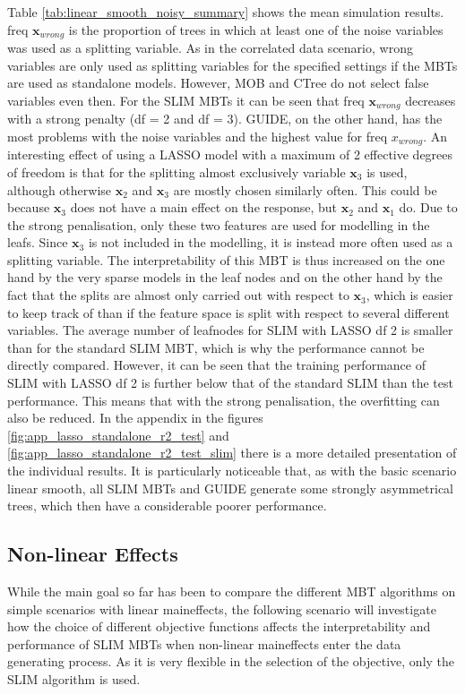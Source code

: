 Table \ref{tab:linear_smooth_noisy_summary} shows the mean simulation results. freq $ \textbf{x}_{wrong}$ is the proportion of trees in which at least one of the noise variables was used as a splitting variable. 
As in the correlated data scenario, wrong variables are only used as splitting variables for the specified settings if the MBTs are used as standalone models. However, MOB and CTree do not select false variables even then. For the SLIM MBTs it can be seen that freq $\textbf{x}_{wrong}$ decreases with a strong penalty (df = 2 and df = 3). GUIDE, on the other hand, has the most problems with the noise variables and the highest value for freq $x_{wrong}$.
An interesting effect of using a LASSO model with a maximum of 2 effective degrees of freedom is that for the splitting almost exclusively variable $\textbf{x}_3$ is used, although otherwise $\textbf{x}_2$ and $\textbf{x}_3$ are mostly chosen similarly often. This could be because $\textbf{x}_3$ does not have a main effect on the response, but $\textbf{x}_2$ and $\textbf{x}_1$ do.  Due to the strong penalisation, only these two features are used for modelling in the leafs. Since $\textbf{x}_3$ is not included in the modelling, it is instead more often used as a splitting variable.
The interpretability of this MBT is thus increased on the one hand by the very sparse models in the leaf nodes and on the other hand by the fact that the splits are almost only carried out with respect to $\textbf{x}_3$, which is easier to keep track of than if the feature space is split with respect to several different variables.
The average number of leafnodes for SLIM with LASSO df 2 is smaller than for the standard SLIM MBT, which is why the performance cannot be directly compared.  However, it can be seen that the training performance of SLIM with LASSO df 2 is further below that of the standard SLIM than the test performance. This means that with the strong penalisation, the overfitting can also be reduced.
In the appendix in the figures \ref{fig:app_lasso_standalone_r2_test} and \ref{fig:app_lasso_standalone_r2_test_slim} there is a more detailed presentation of the individual results. It is particularly noticeable that, as with the basic scenario linear smooth, all SLIM MBTs and GUIDE generate some strongly asymmetrical trees, which then have a considerable poorer performance.




\subsection{Non-linear Effects}
While the main goal so far has been to compare the different MBT algorithms on simple scenarios with linear maineffects, the following scenario will investigate how the choice of different objective functions affects the interpretability and performance of SLIM MBTs when non-linear maineffects enter the data generating process. 
As it is very flexible in the selection of the objective, only the SLIM algorithm is used.

